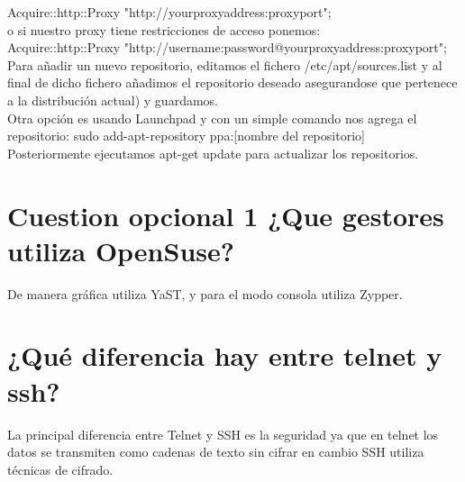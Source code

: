 Acquire::http::Proxy "http://yourproxyaddress:proxyport";\\

o si nuestro proxy tiene restricciones de acceso ponemos:\\

Acquire::http::Proxy "http://username:password@yourproxyaddress:proxyport";\\


Para añadir un nuevo repositorio, editamos el fichero /etc/apt/sources.list y al final de dicho fichero añadimos el repositorio deseado asegurandose que pertenece a la distribución actual) y guardamos.\\

Otra opción es usando Launchpad y con un simple comando nos agrega el repositorio: sudo add-apt-repository ppa:[nombre del repositorio] \\

Posteriormente ejecutamos apt-get update para actualizar los repositorios. \\


\section{Cuestion opcional 1 ¿Que gestores utiliza OpenSuse?}

De manera gráfica utiliza YaST, y para el modo consola utiliza Zypper.

\section{¿Qué diferencia hay entre telnet y ssh? \cite{05c01}}


La principal diferencia entre Telnet y SSH es la seguridad  ya que en telnet los datos se transmiten como cadenas de texto sin cifrar en cambio SSH utiliza técnicas de cifrado.

\clearpage

